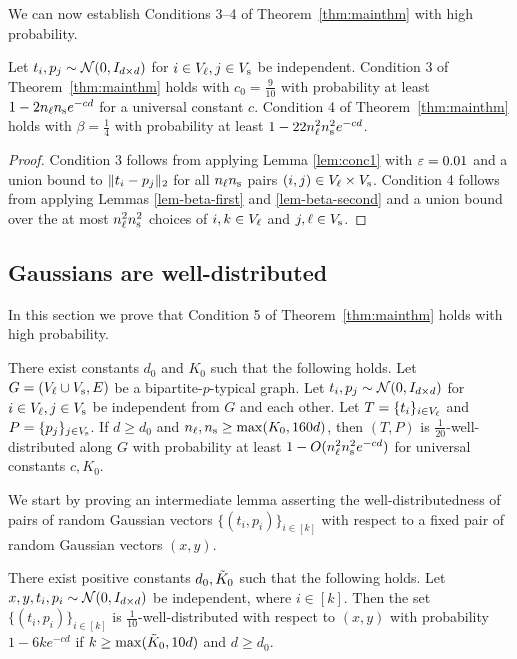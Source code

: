 We can now establish Conditions 3--4 of Theorem~\ref{thm:mainthm} with high probability.
\begin{lemma}\label{lem-conds34}
Let $t_{i}, p_j \sim \mathcal{N}(0, I_{d \times d})$ for $i \in V_\ell, j \in V_\text{s}$ be independent.   Condition 3 of Theorem~\ref{thm:mainthm} holds with $c_0 = \frac{9}{10}$ with probability at least $1 - 2 n_\ell n_\text{s} e^{-cd}$ for a universal constant $c$.  Condition 4 of Theorem~\ref{thm:mainthm} holds with $\beta = \frac{1}{4}$ with probability at least $ 1 - 22 n_\ell^2 n_\text{s}^2 e^{-c d}$. 
\end{lemma}
\begin{proof}
Condition 3 follows from applying Lemma \ref{lem:conc1} with $\varepsilon=0.01$ and a union bound to $\|t_{i} - p_j\|_2$ for all $n_\ell n_\text{s}$ pairs $(i,j) \in V_\ell \times V_\text{s}$.  Condition 4 follows from applying Lemmas \ref{lem-beta-first} and \ref{lem-beta-second} and a union bound over the at most $n_\ell^2 n_\text{s}^2$ choices of $i, k \in V_\ell$ and $j, \ell \in V_\text{s}$. 
\end{proof}


\subsection{Gaussians are well-distributed} \label{sec-gaussians-well-distributed}

In this section we prove that Condition 5 of Theorem~\ref{thm:mainthm} holds with high probability.

\begin{lemma} \label{lem-c4-well-distributed}
There exist constants $d_0$ and $K_0$ such that the following holds.  Let $G = (V_\ell \cup V_\text{s}, E)$ be a bipartite-$p$-typical graph.  Let $t_{i}, p_j \sim \mathcal{N}(0, I_{d \times d})$ for $i \in V_\ell, j \in V_\text{s}$ be independent from $G$ and each other.  Let $T = \{t_{i}\}_{i \in V_\ell}$ and $P = \{p_j\}_{j \in V_\text{s}}$.  If $d \geq d_0$ and $n_\ell, n_\text{s} \geq \max(K_0, 160 d)$, then $(T, P)$ is $\frac{1}{20}$-well-distributed along $G$ with probability at least $1 - O( n_\ell^2 n_\text{s}^2 e^{-cd})$ for  universal constants $c, K_0$.
\end{lemma}

We start by proving an intermediate lemma asserting the well-distributedness
of pairs of random Gaussian vectors $\{(t_i, p_i)\}_{i \in [k]}$ with respect to a fixed pair of random Gaussian vectors $(x,y)$.

\begin{lemma} \label{lem:wd_over_matching}
There exist positive constants $d_0,\tilde{K}_0$ such that the following holds. Let $x,y, t_{i}, p_i \sim \mathcal{N}(0, I_{d \times d})$ be independent, where $i \in [k]$. Then the set $\{(t_i, p_i)\}_{i \in [k]}$
is $\frac{1}{10}$-well-distributed with respect to $(x,y)$ with probability $1 - 6 k e^{-cd}$ if $k \geq \max(\tilde{K}_0, 10d)$ and $d \geq d_0$.
\end{lemma}

